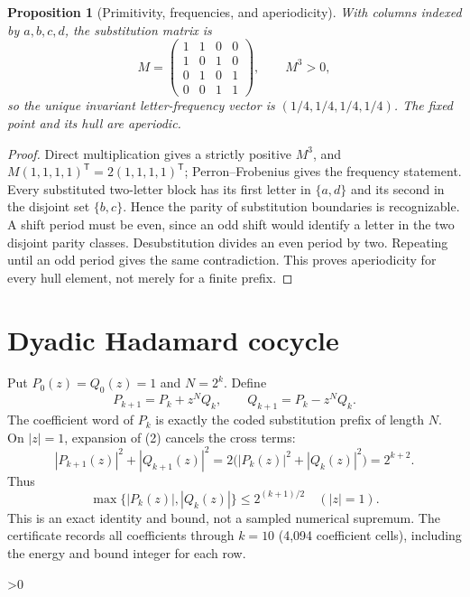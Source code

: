 \documentclass[10pt]{article}
\newtheorem{proposition}{Proposition}
\begin{document}
\begin{proposition}[Primitivity, frequencies, and aperiodicity]
With columns indexed by $a,b,c,d$, the substitution matrix is
\[
 M=\begin{pmatrix}1&1&0&0\\1&0&1&0\\0&1&0&1\\0&0&1&1\end{pmatrix},
 \qquad M^3>0,
\]
so the unique invariant letter-frequency vector is
$(1/4,1/4,1/4,1/4)$.  The fixed point and its hull are aperiodic.
\end{proposition}
\begin{proof}
Direct multiplication gives a strictly positive $M^3$, and
$M(1,1,1,1)^\mathsf{T}=2(1,1,1,1)^\mathsf{T}$; Perron--Frobenius gives the
frequency statement.  Every substituted two-letter block has its first
letter in $\{a,d\}$ and its second in the disjoint set $\{b,c\}$.  Hence the
parity of substitution boundaries is recognizable.  A shift period must be
even, since an odd shift would identify a letter in the two disjoint parity
classes.  Desubstitution divides an even period by two.  Repeating until an
odd period gives the same contradiction.  This proves aperiodicity for every
hull element, not merely for a finite prefix.
\end{proof}

\section{Dyadic Hadamard cocycle}
Put $P_0(z)=Q_0(z)=1$ and $N=2^k$.  Define
\[
 P_{k+1}=P_k+z^NQ_k,\qquad Q_{k+1}=P_k-z^NQ_k .                    \tag{2}
\]
The coefficient word of $P_k$ is exactly the coded substitution prefix of
length $N$.  On $|z|=1$, expansion of (2) cancels the cross terms:
\begin{equation}
 |P_{k+1}(z)|^2+|Q_{k+1}(z)|^2
 =2\bigl(|P_k(z)|^2+|Q_k(z)|^2\bigr)=2^{k+2}.                    \tag{3}
\end{equation}
Thus
\[
 \max\{|P_k(z)|,|Q_k(z)|\}\leq 2^{(k+1)/2}\quad(|z|=1).       \tag{4}
\]
This is an exact identity and bound, not a sampled numerical supremum.  The
certificate records all coefficients through $k=10$ (4,094 coefficient
cells), including the energy and bound integer for each row.

\ifnum\CRevisionRound>0
\end{document}
